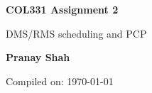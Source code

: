 \begin{titlepage}
    \begin{center}
        \vspace*{6cm}

        {\Huge
        \textbf{COL331 Assignment 2}}

        \vspace{.5cm}
        {\LARGE
            DMS/RMS scheduling and PCP

            \vspace{1.5cm}

        \textbf{Pranay Shah}}
        \vspace{.5cm}

        Compiled on: \today
    \end{center}
\end{titlepage}
